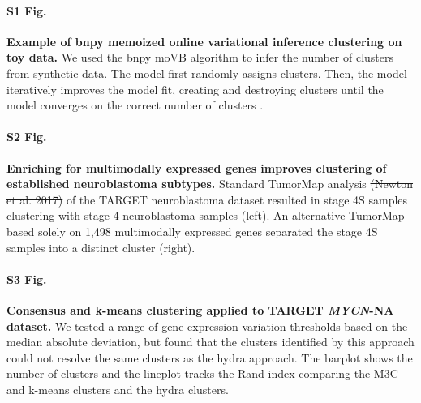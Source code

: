 \documentclass[10pt,letterpaper]{article}
\providecommand{\DIFaddtex}[1]{{\protect\color{blue}\uwave{#1}}} %
\providecommand{\DIFdeltex}[1]{{\protect\color{red}\sout{#1}}}                      %
\providecommand{\DIFaddbegin}{} %
\providecommand{\DIFaddend}{} %
\providecommand{\DIFdelbegin}{} %
\providecommand{\DIFdelend}{} %
\providecommand{\DIFadd}[1]{\texorpdfstring{\DIFaddtex{#1}}{#1}} %
\providecommand{\DIFdel}[1]{\texorpdfstring{\DIFdeltex{#1}}{}} %
\newcommand{\DIFscaledelfig}{0.5}
\newlength{\DIFdelgraphicswidth} %
\newlength{\DIFdelgraphicsheight} %
\newcommand{\DIFaddincludegraphics}[2][]{{\color{blue}\fbox{\DIFOincludegraphics[#1]{#2}}}} %
\newcommand{\DIFdelincludegraphics}[2][]{%
\sbox{\DIFdelgraphicsbox}{\DIFOincludegraphics[#1]{#2}}%
\settoboxwidth{\DIFdelgraphicswidth}{\DIFdelgraphicsbox} %
\settoboxtotalheight{\DIFdelgraphicsheight}{\DIFdelgraphicsbox} %
\scalebox{\DIFscaledelfig}{%
\parbox[b]{\DIFdelgraphicswidth}{\usebox{\DIFdelgraphicsbox}\\[-\baselineskip] \rule{\DIFdelgraphicswidth}{0em}}\llap{\resizebox{\DIFdelgraphicswidth}{\DIFdelgraphicsheight}{%
\setlength{\unitlength}{\DIFdelgraphicswidth}%
\begin{picture}(1,1)%
\thicklines\linethickness{2pt} %
{\color[rgb]{1,0,0}\put(0,0){\framebox(1,1){}}}%
{\color[rgb]{1,0,0}\put(0,0){\line( 1,1){1}}}%
{\color[rgb]{1,0,0}\put(0,1){\line(1,-1){1}}}%
\end{picture}%
}\hspace*{3pt}}} %
} %
\DeclareRobustCommand{\DIFaddbegin}{\DIFOaddbegin \let\includegraphics\DIFaddincludegraphics} %
\DeclareRobustCommand{\DIFaddend}{\DIFOaddend \let\includegraphics\DIFOincludegraphics} %
\DeclareRobustCommand{\DIFdelbegin}{\DIFOdelbegin \let\includegraphics\DIFdelincludegraphics} %
\DeclareRobustCommand{\DIFdelend}{\DIFOaddend \let\includegraphics\DIFOincludegraphics} %
\begin{document}
\paragraph*{S1 Fig.}
\label{S1_Fig}
{\bf Example of bnpy memoized online variational inference clustering on toy data.} We used the bnpy moVB algorithm to infer the number of clusters from synthetic data. The model first randomly assigns clusters. Then, the model iteratively improves the model fit, creating and destroying clusters until the model converges on the correct number of clusters \DIFaddbegin \DIFadd{at lap 16 }\DIFaddend \cite{hughesBnpyReliableScalable}.

\paragraph*{S2 Fig.}
\label{S2_Fig}
{\bf Enriching for multimodally expressed genes improves clustering of established neuroblastoma subtypes.} Standard TumorMap analysis \DIFdelbegin \DIFdel{(Newton et al. 2017) }\DIFdelend of the TARGET neuroblastoma dataset resulted in stage 4S samples clustering with stage 4 neuroblastoma samples (left). An alternative TumorMap based solely on 1,498 multimodally expressed genes separated the stage 4S samples into a distinct cluster (right).

\paragraph*{S3 Fig.}
\label{S3_Fig}
{\DIFdelbegin %
\DIFdelend \DIFaddbegin \bf{Consensus and k-means clustering applied to TARGET \textit{MYCN}-NA dataset.}\DIFaddend } We tested a range of gene expression variation thresholds based on the median absolute deviation, but found that the clusters identified by this approach could not resolve the same clusters as the hydra approach. The barplot shows the number of clusters and the lineplot tracks the Rand index comparing the M3C and k-means clusters and the hydra clusters.
\end{document}
